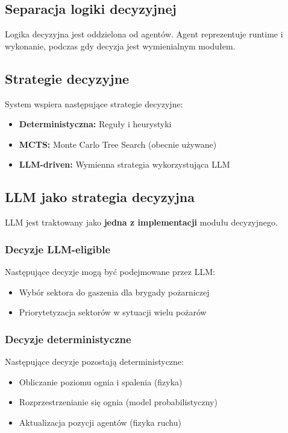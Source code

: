 \documentclass[11pt,a4paper]{article}
\begin{document}
\subsection{Separacja logiki decyzyjnej}

Logika decyzyjna jest oddzielona od agentów. Agent reprezentuje runtime i wykonanie, podczas gdy decyzja jest wymienialnym modułem.

\subsection{Strategie decyzyjne}

System wspiera następujące strategie decyzyjne:

\begin{itemize}
    \item \textbf{Deterministyczna:} Reguły i heurystyki
    \item \textbf{MCTS:} Monte Carlo Tree Search (obecnie używane)
    \item \textbf{LLM-driven:} Wymienna strategia wykorzystująca LLM
\end{itemize}

\subsection{LLM jako strategia decyzyjna}

LLM jest traktowany jako \textbf{jedna z implementacji} modułu decyzyjnego.

\subsubsection{Decyzje LLM-eligible}

Następujące decyzje mogą być podejmowane przez LLM:
\begin{itemize}
    \item Wybór sektora do gaszenia dla brygady pożarniczej
    \item Priorytetyzacja sektorów w sytuacji wielu pożarów
\end{itemize}

\subsubsection{Decyzje deterministyczne}

Następujące decyzje pozostają deterministyczne:
\begin{itemize}
    \item Obliczanie poziomu ognia i spalenia (fizyka)
    \item Rozprzestrzenianie się ognia (model probabilistyczny)
    \item Aktualizacja pozycji agentów (fizyka ruchu)
\end{itemize}
\end{document}
